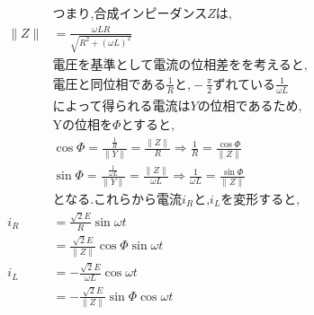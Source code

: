 \documentclass[twocolumn]{article}
\begin{document}
\begin{enumerate}
\begin{align*}
                        & \text{つまり,合成インピーダンス}Z\text{は,}                                                                                                  \\
          \|Z\|         & = \frac{\omega LR}{\sqrt{R^2 + {\left(\omega L\right)}^2}}                                                                      \\
                        & \text{電圧を基準として電流の位相差をを考えると,}                                                                                                    \\
                        & \text{電圧と同位相である}\frac{1}{R}\text{と,}-\frac{\pi}{2}\text{ずれている}\frac{1}{\omega L}                                                \\
                        & \text{によって得られる電流は}Y\text{の位相であるため,}                                                                                             \\
                        & \text{Yの位相を}\Phi\text{とすると,}                                                                                                    \\
                        & \cos \Phi = \frac{\frac{1}{R}}{\|Y\|} = \frac{\|Z\|}{R} \Rightarrow  \frac{1}{R} = \frac{\cos \Phi}{\|Z\|}                      \\
                        & \sin \Phi = \frac{\frac{1}{\omega L}}{\|Y\|} = \frac{\|Z\|}{\omega L} \Rightarrow  \frac{1}{\omega L} = \frac{\sin \Phi}{\|Z\|} \\
                        & \text{となる.これらから電流}i_R\text{と,}i_L\text{を変形すると,}                                                                                 \\
          i_R           & = \frac{\sqrt{2}E}{R}\sin \omega t                                                                                              \\
                        & = \frac{\sqrt{2}E}{\|Z\|}\cos \Phi \sin \omega t                                                                                \\
          i_L           & = -\frac{\sqrt{2}E}{\omega L} \cos \omega t                                                                                     \\
                        & = -\frac{\sqrt{2}E}{\|Z\|} \sin \Phi \cos \omega t                                                                              \\

\end{align*}
\end{enumerate}
\end{document}
